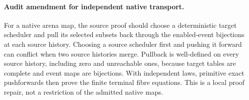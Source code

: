 \documentclass{article}
\begin{document}
\paragraph{Audit amendment for independent native transport.}
For a native arena map, the source proof should choose a deterministic target
scheduler and pull its selected subsets back through the enabled-event
bijections at each source history. Choosing a source scheduler first and
pushing it forward can conflict when two source histories merge. Pullback
is well-defined on every source history, including zero and unreachable
ones, because target tables are complete and event maps are bijections.
With independent laws, primitive exact pushforwards then prove the finite
terminal fibre equations. This is a local proof repair, not a restriction of
the admitted native maps.
\end{document}
